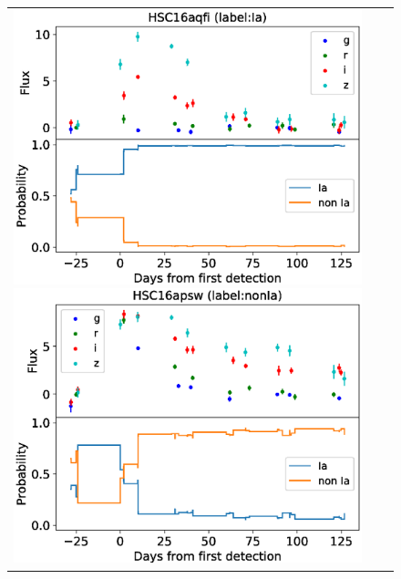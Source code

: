 \documentclass[useamsfonts]{pasj01}
\begin{document}
%
%
\begin{figure}[htbp]
    \begin{tabular}{ccc}
        \begin{minipage}{0.33\hsize}
            \begin{center}
                \includegraphics[width=\columnwidth]{figures/lcp_aqfi.eps}
            \end{center}
        \end{minipage}
        \begin{minipage}{0.33\hsize}
            \begin{center}
                \includegraphics[width=\columnwidth]{figures/lcp_apsw.eps}

\end{center}
\end{minipage}
\end{tabular}
\end{figure}
\end{document}
